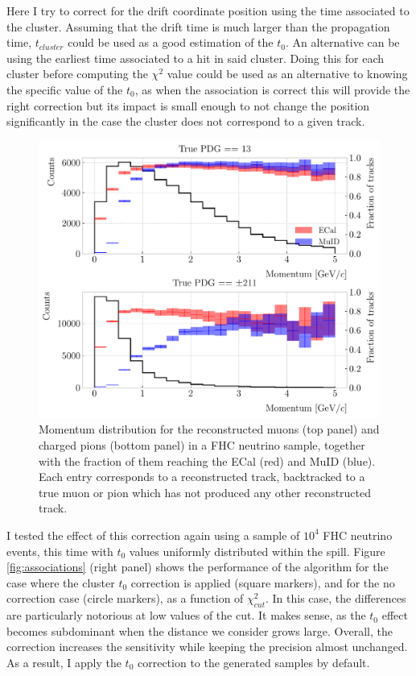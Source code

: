 Here I try to correct for the drift coordinate position using the time associated to the cluster. Assuming that the drift time is much larger than the propagation time, $t_{cluster}$ could be used as a good estimation of the $t_{0}$. An alternative can be using the earliest time associated to a hit in said cluster. Doing this for each cluster before computing the $\chi^{2}$ value could be used as an alternative to knowing the specific value of the $t_{0}$, as when the association is correct this will provide the right correction but its impact is small enough to not change the position significantly in the case the cluster does not correspond to a given track.

\begin{figure}[t]
	\centering
	\includegraphics[width=.80\linewidth]{Images/GArSoft_PID/BDT/fraction_vs_preco_no_duplicates.pdf}
	\caption[Momentum distribution for the reconstructed muons and charged pions in a FHC sample, together with the fraction of them reaching the ECal and MuID.]{Momentum distribution for the reconstructed muons (top panel) and charged pions (bottom panel) in a FHC neutrino sample, together with the fraction of them reaching the ECal (red) and MuID (blue). Each entry corresponds to a reconstructed track, backtracked to a true muon or pion which has not produced any other reconstructed track.}
	\label{fig:fraction_particles_ecal_muid}
\end{figure}

I tested the effect of this correction again using a sample of $10^{4}$ FHC neutrino events, this time with $t_{0}$ values uniformly distributed within the spill. Figure \ref{fig:associations} (right panel) shows the performance of the algorithm for the case where the cluster $t_{0}$ correction is applied (square markers), and for the no correction case (circle markers), as a function of $\chi^{2}_{cut}$. In this case, the differences are particularly notorious at low values of the cut. It makes sense, as the $t_{0}$ effect becomes subdominant when the distance we consider grows large. Overall, the correction increases the sensitivity while keeping the precision almost unchanged. As a result, I apply the $t_{0}$ correction to the generated samples by default.

